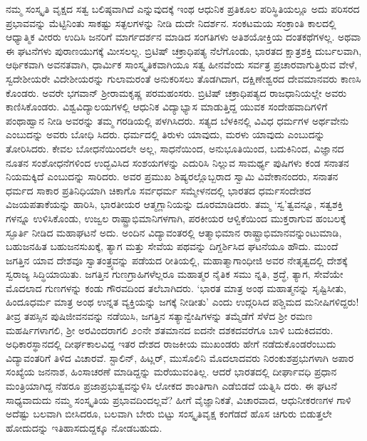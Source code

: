 ನಮ್ಮ ಸಂಸ್ಕೃತಿ ವೃಕ್ಷದ ಸತ್ವ ಬಲಿಷ್ಠವಾಗಿದೆ ಎನ್ನುವುದಕ್ಕೆ ಇಂಥ ಆಧುನಿಕ ಪ್ರತಿಕೂಲ ಪರಿಸ್ಥಿತಿಯಲ್ಲೂ ಅದು ಪರಿಸರದ ಪ್ರಭಾವವನ್ನು ಮೆಟ್ಟಿನಿಂತು ಸಾಕಷ್ಟು ಸತ್ಫಲಗಳನ್ನು ನೀಡಿ ದುದೇ ನಿದರ್ಶನ. ಸಂಕಟಮಯ ಸಂಕ್ರಾಂತಿ ಕಾಲದಲ್ಲಿ ಆಧ್ಯಾತ್ಮಿಕ ವೀರರು ಉದಿಸಿ ಜನರಿಗೆ ಮಾರ್ಗದರ್ಶನ ಮಾಡಿದ ಸಂಗತಿಗಳು ಅತಿಶಯೋಕ್ತಿಯ ದಂತಕಥೆಗಳಲ್ಲ. ಅಥವಾ ಈ ಘಟನೆಗಳು ಪುರಾಣಯುಗಕ್ಕೆ ಮೀಸಲಲ್ಲ. ಬ್ರಿಟಿಷ್ ಚಕ್ರಾಧಿಪತ್ಯ ನೆಲೆಗೊಂಡು, ಭಾರತದ ಕ್ಷಾತ್ರಶಕ್ತಿ ದುರ್ಬಲವಾಗಿ, ಆರ್ಥಿಕವಾಗಿ ಅವನತವಾಗಿ, ಧಾರ್ಮಿಕ ಸಾಂಸ್ಕೃತಿಕವಾಗಿಯೂ ಸತ್ವ ಹೀನವೆಂದು ಸರ್ವತ್ರ ಪ್ರಚಾರವಾಗುತ್ತಿರುವ ವೇಳೆ, ಸ್ವದೇಶೀಯರೇ ವಿದೇಶೀಯರನ್ನು ಗುಲಾಮರಂತೆ ಅನುಕರಿಸಲು ತೊಡಗಿದಾಗ, ದಕ್ಷಿಣೇಶ್ವರದ ದೇವಮಾನವರು ಕಾಣಸಿ ಕೊಂಡರು. ಅವರೇ ಭಗವಾನ್ ಶ‍್ರೀರಾಮಕೃಷ್ಣ ಪರಮಹಂಸರು. ಬ್ರಿಟಿಷ್ ಚಕ್ರಾಧಿಪತ್ಯದ ರಾಜಧಾನಿಯಲ್ಲೇ ಅವರು ಕಾಣಿಸಿಕೊಂಡರು. ವಿಶ್ವವಿದ್ಯಾಲಯಗಳಲ್ಲಿ ಆಧುನಿಕ ವಿದ್ಯಾಭ್ಯಾಸ ಮಾಡುತ್ತಿದ್ದ ಯುವಕ ಸಂದೇಹವಾದಿಗಳಿಗೆ ಪಂಥಾಹ್ವಾನ ನೀಡಿ ಅವರನ್ನು ತಮ್ಮ ಗರಡಿಯಲ್ಲಿ ಪಳಗಿಸಿದರು. ಸತ್ಯದ ಬೆಳಕಿನಲ್ಲಿ ವಿವಿಧ ಧರ್ಮಗಳ ಅರ್ಥವೇನು ಎಂಬುದನ್ನು ಅವರು ಬೋಧಿ ಸಿದರು. ಧರ್ಮದಲ್ಲಿ ತಿರುಳು ಯಾವುದು, ಮರಳು ಯಾವುದು ಎಂಬುದನ್ನು ತೋರಿಸಿದರು. ಕೇವಲ ಬೋಧನೆಯಿಂದಲೇ ಅಲ್ಲ, ಸಾಧನೆಯಿಂದ, ಅನುಭೂತಿಯಿಂದ, ಬದುಕಿನಿಂದ, ವಿಜ್ಞಾನದ ನೂತನ ಸಂಶೋಧನೆಗಳಿಂದ ಉದ್ಭವಿಸಿದ ಸಂಶಯಗಳನ್ನು ಎದುರಿಸಿ ನಿಲ್ಲುವ ಸಾಮರ್ಥ್ಯ ಪುಷಿಗಳು ಕಂಡ ಸನಾತನ ನಿಯಮಕ್ಕಿದೆ ಎಂಬುದನ್ನು ಸಾರಿದರು. ಅವರ ಪ್ರಮುಖ ಶಿಷ್ಯರಲ್ಲೊಬ್ಬರಾದ ಸ್ವಾಮಿ ವಿವೇಕಾನಂದರು, ಸನಾತನ ಧರ್ಮದ ಸಾಕಾರ ಪ್ರತಿನಿಧಿಯಾಗಿ ಚಿಕಾಗೊ ಸರ್ವಧರ್ಮ ಸಮ್ಮೇಳನದಲ್ಲಿ ಭಾರತದ ಧರ್ಮಸಂದೇಶದ ವಿಜಯಪತಾಕೆಯನ್ನು ಹಾರಿಸಿ, ಭಾರತೀಯರ ಆತ್ಮಗ್ಲಾನಿಯನ್ನು ದೂರಮಾಡಿದರು. ತಮ್ಮ ‘ಸ್ವ’ತ್ವವನ್ನೂ, ಸತ್ವಶಕ್ತಿ ಗಳನ್ನೂ ಉಳಿಸಿಕೊಂಡು, ಉಜ್ವಲ ರಾಷ್ಟ್ರಾಭಿಮಾನಿಗಳಗಾಗಿ, ಪರಕೀಯರ ಆಳ್ವಿಕೆಯಿಂದ ಮುಕ್ತರಾಗುವ ಹಂಬಲಕ್ಕೆ ಸ್ಫೂರ್ತಿ ನೀಡಿದ ಮಹಾಘಟನೆ ಅದು. ಅಂದಿನ ವಿದ್ಯಾವಂತರಲ್ಲಿ ಆತ್ಮಾಭಿಮಾನ ರಾಷ್ಟ್ರಾಭಿಮಾನವನ್ನುಂಟುಮಾಡಿ, ಬಹುಜನಹಿತ ಬಹುಜನಸುಖಕ್ಕೆ, ತ್ಯಾಗ ಮತ್ತು ಸೇವೆಯ ಪಥವನ್ನು ದಿಗ್ದರ್ಶಿಸಿದ ಘಟನೆಯೂ ಹೌದು. ಮುಂದೆ ಜಗತ್ತಿನ ಯಾವ ದೇಶವೂ ಸ್ವಾತಂತ್ರ್ಯವನ್ನು ಪಡೆಯದ ರೀತಿಯಲ್ಲಿ, ಮಹಾತ್ಮಾಗಾಂಧೀಜಿ ಅವರ ನೇತೃತ್ವದಲ್ಲಿ ದೇಶಕ್ಕೆ ಸ್ವರಾಜ್ಯ ಸಿದ್ಧಿಯಾಯಿತು. ಜಗತ್ತಿನ ಗುಣಗ್ರಾಹಿಗಳೆಲ್ಲರೂ ಮಹಾತ್ಮರ ನೈತಿಕ ಸಮು ನ್ನತಿ, ಶ್ರದ್ಧೆ, ತ್ಯಾಗ, ಸೇವೆಯೇ ಮೊದಲಾದ ಗುಣಗಳನ್ನು ಕಂಡು ಗೌರವದಿಂದ ತಲೆಬಾಗಿದರು. ‘ಭಾರತ ಮಾತ್ರ ಅಂಥ ಮಹಾತ್ಮನನ್ನು ಸೃಷ್ಟಿಸೀತು, ಹಿಂದೂಧರ್ಮ ಮಾತ್ರ ಅಂಥ ಉನ್ನತ ವ್ಯಕ್ತಿಯನ್ನು ಜಗಕ್ಕೆ ನೀಡೀತು’ ಎಂದು ಉದ್ಗರಿಸಿದ ಪಶ್ಚಿಮದ ಮನೀಷಿಗಳಿದ್ದರು! ತೀವ್ರ ತಪಸ್ಸಿನ ಪುಷಿಜೀವನವನ್ನು ನಡೆಯಿಸಿ, ಜಗತ್ತಿನ ಸತ್ಯಾನ್ವೇಷಿಗಳನ್ನು ತಮ್ಮೆಡೆಗೆ ಸೆಳೆದ ಶ‍್ರೀ ರಮಣ ಮಹರ್ಷಿಗಳಾಗಲಿ, ಶ‍್ರೀ ಅರವಿಂದರಾಗಲಿ ೨೦ನೇ ಶತಮಾನದ ಐದನೇ ದಶಕದವರೆಗೂ ಬಾಳಿ ಬದುಕಿದವರು. ಅಧಿಕಾರಸ್ಥಾನದಲ್ಲಿ ದೀರ್ಘಕಾಲವಿದ್ದ ಇತರ ದೇಶದ ರಾಜಕೀಯ ಮುಖಂಡರು ಹೇಗೆ ನಡೆದುಕೊಂಡರೆಂಬುದು ವಿದ್ಯಾವಂತರಿಗೆ ತಿಳಿದ ವಿಚಾರವೆ. ಸ್ಟಾಲಿನ್, ಹಿಟ್ಲರ್, ಮುಸೊಲಿನಿ ಮೊದಲಾದವರು ನಿರಂಕುಶಪ್ರಭುಗಳಾಗಿ ಅಪಾರ ಸಂಖ್ಯೆಯ ಜನನಾಶ, ಹಿಂಸಾಚರಣೆ ಮಾಡಿದ್ದನ್ನು ಮರೆಯುವಂತಿಲ್ಲ. ಆದರೆ ಭಾರತದಲ್ಲಿ ದೀರ್ಘಾವಧಿ ಪ್ರಧಾನ ಮಂತ್ರಿಯಾಗಿದ್ದ ನೆಹರೂ ಪ್ರಜಾಪ್ರಭುತ್ವವನ್ನುಳಿಸಿ ಲೋಕದ ಶಾಂತಿಗಾಗಿ ಎಡೆಬಿಡದೆ ಯತ್ನಿಸಿ ದರು. ಈ ಘಟನೆ ಸಾಧ್ಯವಾದುದು ನಮ್ಮ ಸಂಸ್ಕೃತಿಯ ಪ್ರಭಾವದಿಂದಲ್ಲವೆ? ಹೀಗೆ ವೈಜ್ಞಾನಿಕತೆ, ವಿಚಾರವಾದ, ಆಧುನೀಕರಣಗಳ ಗಾಳಿ ಅದೆಷ್ಟು ಬಲವಾಗಿ ಬೀಸಿದರೂ, ಬಲವಾಗಿ ಬೇರು ಬಿಟ್ಟು ಸಂಸ್ಕೃತಿವೃಕ್ಷ ಕಂಗೆಡದೆ ಹೊಸ ಚಿಗುರು ಬಿಡುತ್ತಲೇ ಹೋದುದನ್ನು ಇತಿಹಾಸದುದ್ದಕ್ಕೂ ನೋಡಬಹುದು.

